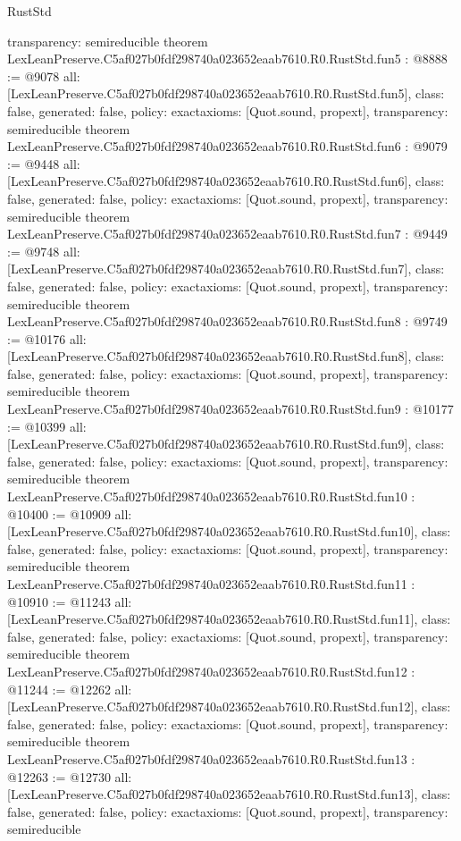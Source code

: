 \begin{lexlean}{RustStd}
\begin{coremodule}
{  transparency: semireducible
}
theorem LexLeanPreserve.C5af027b0fdf298740a023652eaab7610.R0.RustStd.fun5 : @8888 := @9078 {
  all: [LexLeanPreserve.C5af027b0fdf298740a023652eaab7610.R0.RustStd.fun5],
  class: false,
  generated: false,
  policy: exact{axioms: [Quot.sound, propext]},
  transparency: semireducible
}
theorem LexLeanPreserve.C5af027b0fdf298740a023652eaab7610.R0.RustStd.fun6 : @9079 := @9448 {
  all: [LexLeanPreserve.C5af027b0fdf298740a023652eaab7610.R0.RustStd.fun6],
  class: false,
  generated: false,
  policy: exact{axioms: [Quot.sound, propext]},
  transparency: semireducible
}
theorem LexLeanPreserve.C5af027b0fdf298740a023652eaab7610.R0.RustStd.fun7 : @9449 := @9748 {
  all: [LexLeanPreserve.C5af027b0fdf298740a023652eaab7610.R0.RustStd.fun7],
  class: false,
  generated: false,
  policy: exact{axioms: [Quot.sound, propext]},
  transparency: semireducible
}
theorem LexLeanPreserve.C5af027b0fdf298740a023652eaab7610.R0.RustStd.fun8 : @9749 := @10176 {
  all: [LexLeanPreserve.C5af027b0fdf298740a023652eaab7610.R0.RustStd.fun8],
  class: false,
  generated: false,
  policy: exact{axioms: [Quot.sound, propext]},
  transparency: semireducible
}
theorem LexLeanPreserve.C5af027b0fdf298740a023652eaab7610.R0.RustStd.fun9 : @10177 := @10399 {
  all: [LexLeanPreserve.C5af027b0fdf298740a023652eaab7610.R0.RustStd.fun9],
  class: false,
  generated: false,
  policy: exact{axioms: [Quot.sound, propext]},
  transparency: semireducible
}
theorem LexLeanPreserve.C5af027b0fdf298740a023652eaab7610.R0.RustStd.fun10 : @10400 := @10909 {
  all: [LexLeanPreserve.C5af027b0fdf298740a023652eaab7610.R0.RustStd.fun10],
  class: false,
  generated: false,
  policy: exact{axioms: [Quot.sound, propext]},
  transparency: semireducible
}
theorem LexLeanPreserve.C5af027b0fdf298740a023652eaab7610.R0.RustStd.fun11 : @10910 := @11243 {
  all: [LexLeanPreserve.C5af027b0fdf298740a023652eaab7610.R0.RustStd.fun11],
  class: false,
  generated: false,
  policy: exact{axioms: [Quot.sound, propext]},
  transparency: semireducible
}
theorem LexLeanPreserve.C5af027b0fdf298740a023652eaab7610.R0.RustStd.fun12 : @11244 := @12262 {
  all: [LexLeanPreserve.C5af027b0fdf298740a023652eaab7610.R0.RustStd.fun12],
  class: false,
  generated: false,
  policy: exact{axioms: [Quot.sound, propext]},
  transparency: semireducible
}
theorem LexLeanPreserve.C5af027b0fdf298740a023652eaab7610.R0.RustStd.fun13 : @12263 := @12730 {
  all: [LexLeanPreserve.C5af027b0fdf298740a023652eaab7610.R0.RustStd.fun13],
  class: false,
  generated: false,
  policy: exact{axioms: [Quot.sound, propext]},
  transparency: semireducible
}
\end{coremodule}
\end{lexlean}
